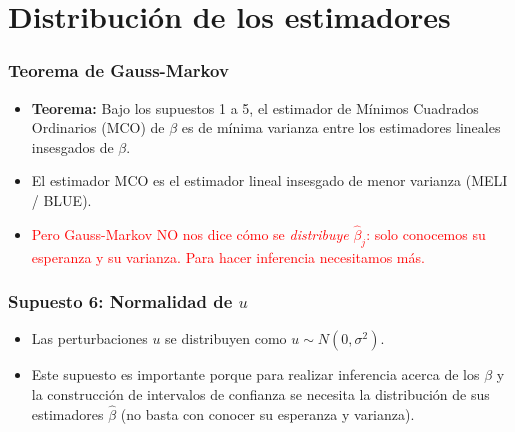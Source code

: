 \documentclass{beamer}
\begin{document}

\section{Distribución de los estimadores}

\begin{frame}
\frametitle{Teorema de Gauss-Markov}
\begin{itemize}
    \item \textbf{Teorema:} Bajo los supuestos 1 a 5, el estimador de Mínimos Cuadrados Ordinarios (MCO) de $\beta$ es de mínima varianza entre los estimadores lineales insesgados de $\beta$.
    \item El estimador MCO es el estimador lineal insesgado de menor varianza (MELI / BLUE).
    \item \textcolor{red}{Pero Gauss-Markov NO nos dice cómo se \emph{distribuye} $\hat{\beta}_j$: solo conocemos su esperanza y su varianza. Para hacer inferencia necesitamos más.}
\end{itemize}
\end{frame}

\begin{frame}
\frametitle{Supuesto 6: Normalidad de $u$}
\begin{itemize}
    \item Las perturbaciones $u$ se distribuyen como $u \sim N(0, \sigma^2)$.
    \item Este supuesto es importante porque para realizar inferencia acerca de los $\beta$ y la construcción de intervalos de confianza se necesita la distribución de sus estimadores $\hat{\beta}$ (no basta con conocer su esperanza y varianza).
\end{itemize}
\end{frame}
\end{document}
